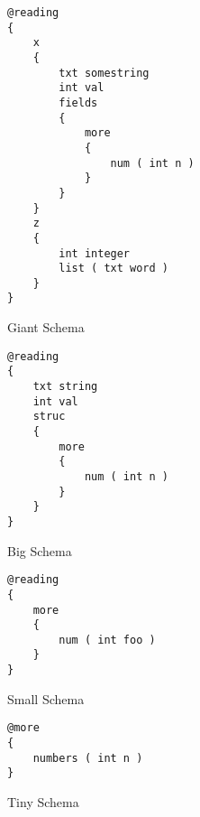 \begin{figure}[h]
\begin{lstlisting}
@reading
{
	x
	{
		txt somestring
		int val
		fields
		{
			more
			{
				num ( int n )
			}
		}
	}
	z
	{
		int integer
		list ( txt word )
	}
}
\end{lstlisting}
\caption{Giant Schema}
\end{figure}

\begin{figure}[t]
\begin{lstlisting}
@reading
{
	txt string
	int val
	struc
	{
		more
		{
			num ( int n )
		}
	}
}
\end{lstlisting}
\caption{Big Schema}
\end{figure}

\begin{figure}[t]
\begin{lstlisting}
@reading
{
	more
	{
		num ( int foo )
	}
}
\end{lstlisting}
\caption{Small Schema}
\end{figure}

\begin{figure}[t]
\begin{lstlisting}
@more
{
	numbers ( int n )
}
\end{lstlisting}
\caption{Tiny Schema}
\end{figure}
